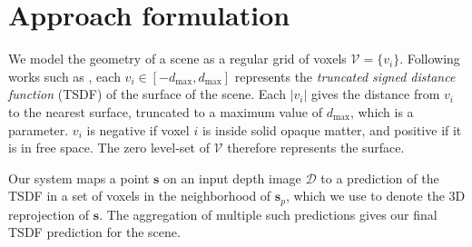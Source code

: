 \documentclass[10pt,twocolumn,letterpaper]{article}
\newcommand{\rgbdimage}{\mathcal{D}}
\newcommand{\pixelidx}{\mathbf{s}}
\newcommand{\voxelgrid}{\mathcal{V}}
\newcommand{\voxel}{v}
\newcommand{\voxidx}{i}
\newcommand{\project}{\mathbf{p}}
\renewcommand{\paragraph}{\vspace{2pt}\noindent\textbf}
\begin{document}


\section{Approach formulation}


We model the geometry of a scene as a regular grid of voxels $\voxelgrid = \{\voxel_\voxidx\}$.
Following works such as \cite{izadi-uist-2011, prisacariu-iccv-2011}, each $\voxel_\voxidx \in [-d_{\max}, d_{\max}]$ represents the \emph{truncated signed distance function} (TSDF) of the surface of the scene.
Each $|\voxel_\voxidx|$ gives the distance from $\voxel_\voxidx$ to the nearest surface, truncated to a maximum value of $d_{\max}$, which is a parameter.
$\voxel_\voxidx$ is negative if voxel $\voxidx$ is inside solid opaque matter, and positive if it is in free space.
The zero level-set of $\voxelgrid$ therefore represents the surface.

\newcommand{\voxregion}{\mathcal{R}}

Our system maps a point $\pixelidx$ on an input depth image $\rgbdimage$ to a prediction of the TSDF in a set of voxels in the neighborhood of $\pixelidx_p$, which we use to denote the 3D reprojection of $\pixelidx$.
The aggregation of multiple such predictions gives our final TSDF prediction for the scene.


\end{document}
